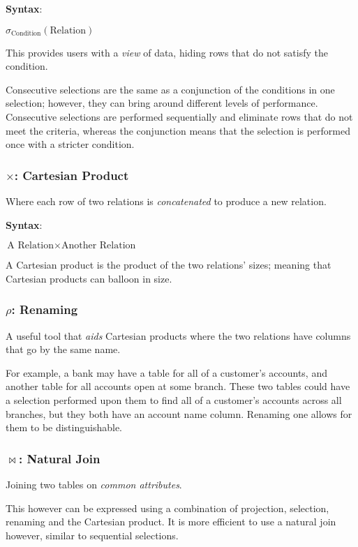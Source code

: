 \documentclass{article}
\begin{document}
\textbf{Syntax}:

$\sigma_{\text{Condition}}(\text{Relation})$

This provides users with a \textit{view} of data, hiding rows that do not satisfy the condition.

Consecutive selections are the same as a conjunction of the conditions in one selection; however, they can bring around different levels of performance. Consecutive selections are performed sequentially and eliminate rows that do not meet the criteria, whereas the conjunction means that the selection is performed once with a stricter condition.

\subsubsection{$\times$: Cartesian Product}

Where each row of two relations is \textit{concatenated} to produce a new relation.

\textbf{Syntax}:

$\text{A Relation} \times \text{Another Relation}$

A Cartesian product is the product of the two relations' sizes; meaning that Cartesian products can balloon in size.

\subsubsection{$\rho$: Renaming}

A useful tool that \textit{aids} Cartesian products where the two relations have columns that go by the same name.

For example, a bank may have a table for all of a customer's accounts, and another table for all accounts open at some branch. These two tables could have a selection performed upon them to find all of a customer's accounts across all branches, but they both have an account name column. Renaming one allows for them to be distinguishable. 

\subsubsection{$\Join$: Natural Join}

Joining two tables on \textit{common attributes}.

This however can be expressed using a combination of projection, selection, renaming and the Cartesian product. It is more efficient to use a natural join however, similar to sequential selections.
\end{document}

